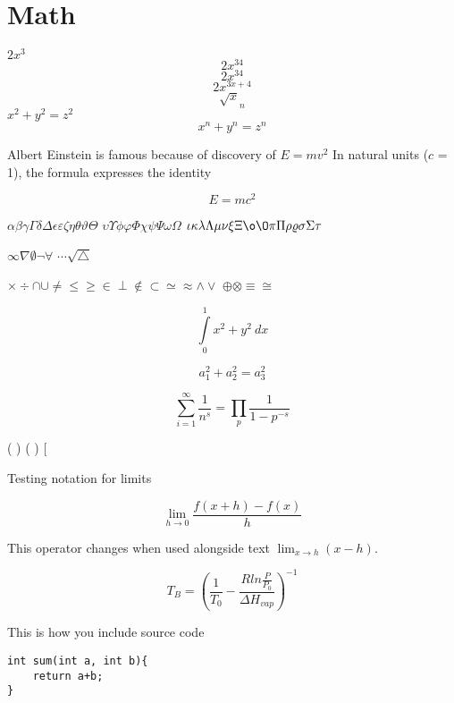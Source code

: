 \documentclass{article}
\begin{document}
\section{Math\label{math}}
$2x^3$
$$2x^34$$
$$2x^{34}$$
$$2x^{3x+4}$$
$$\sqrt x_n$$
\(x^2 + y^2 = z^2\)
\[ x^n + y^n = z^n \]

Albert Einstein is famous because of discovery of $E=mv^2$
In natural units ($c$ = 1), the formula expresses the identity

\begin{equation}
E=mc^2
\end{equation}

$\alpha \beta \gamma \Gamma \delta \Delta \epsilon \varepsilon \zeta \eta \theta \vartheta \Theta $
$\upsilon \Upsilon \phi \varphi \Phi \chi \psi \Psi \omega \Omega $
$\iota \kappa \lambda \Lambda \mu \nu \xi \Xi \o \O \pi \Pi \rho \varrho \sigma \Sigma \tau $

$\infty \nabla \emptyset \neg \forall $
$\cdots \surd \triangle$

$\times \div \cap \cup \neq \leq \geq \in \perp \notin \subset \simeq \approx \wedge \vee $
$\oplus \otimes \equiv \cong$

\[ \int\limits_0^1 x^2 + y^2 \ dx \]

\[ a_1^2 + a_2^2 = a_3^2 \]

\[ \sum_{i=1}^{\infty} \frac{1}{n^s} 
= \prod_p \frac{1}{1 - p^{-s}} \]

\big( \Big) \bigg( \Bigg)
\big[ \Big[ \bigg] \Bigg[

Testing notation for limits

\[
\lim_{h \rightarrow 0 } \frac{f(x+h)-f(x)}{h}
\]

This operator changes when used alongside
text \( \lim_{x \rightarrow h} (x-h) \).


$$ T_B = \left( \frac{1}{T_0} - \frac{R ln \frac{P}{P_0}}{\Delta H_{vap}} \right) ^ {-1} $$

This is how you include source code

\begin{lstlisting}
int sum(int a, int b){
    return a+b;
}
\end{lstlisting}


\end{document}

